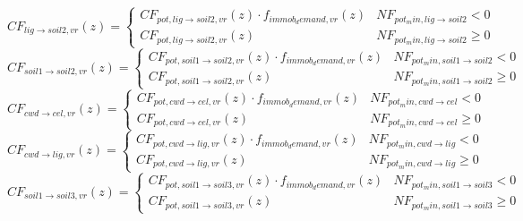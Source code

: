 \begin{equation}
    C F_{lig \rightarrow soil2, vr}(z)=\left\{\begin{array}{ll}C F_{pot, lig \rightarrow soil2, vr}(z) \cdot f_{i m m o b_{d} e m a n d, vr}(z) & N F_{pot_{m} i n, lig \rightarrow soil2}<0 \\ C F_{pot, lig \rightarrow soil2, vr}(z) & N F_{pot_{m} i n, lig \rightarrow soil2} \geq 0\end{array}\right.
\end{equation}
\begin{equation}
    C F_{soil1 \rightarrow soil2, vr}(z)=\left\{\begin{array}{ll}C F_{pot, soil1 \rightarrow soil2, vr}(z) \cdot f_{i m m o b_{d} e m a n d, vr}(z) & N F_{pot_{m} i n, soil1 \rightarrow soil2}<0 \\ C F_{pot, soil1 \rightarrow soil2, vr}(z) & N F_{pot_{m} i n, soil1 \rightarrow soil2} \geq 0\end{array}\right.
\end{equation}
\begin{equation}
    C F_{cwd \rightarrow cel, vr}(z)=\left\{\begin{array}{ll}C F_{pot, cwd \rightarrow cel, vr}(z) \cdot f_{i m m o b_{d} e m a n d, vr}(z) & N F_{pot_{m} i n, cwd \rightarrow cel}<0 \\ C F_{pot, cwd \rightarrow cel, vr}(z) & N F_{pot_{m} i n, cwd \rightarrow cel} \geq 0\end{array}\right.
\end{equation}
\begin{equation}
    C F_{cwd \rightarrow lig, vr}(z)=\left\{\begin{array}{ll}C F_{pot, cwd \rightarrow lig, vr}(z) \cdot f_{i m m o b_{d} e m a n d, vr}(z) & N F_{pot_{m} i n, cwd \rightarrow lig}<0 \\ C F_{pot, cwd \rightarrow lig, vr}(z) & N F_{pot_{m} i n, cwd \rightarrow lig} \geq 0\end{array}\right.
\end{equation}
\begin{equation}
    C F_{soil1 \rightarrow soil3, vr}(z)=\left\{\begin{array}{ll}C F_{pot, soil1 \rightarrow soil3, vr}(z) \cdot f_{i m m o b_{d} e m a n d, vr}(z) & N F_{pot_{m} i n, soil1 \rightarrow soil3}<0 \\ C F_{pot, soil1 \rightarrow soil3, vr}(z) & N F_{pot_{m} i n, soil1 \rightarrow soil3} \geq 0\end{array}\right.
\end{equation}
